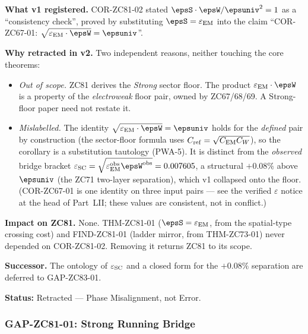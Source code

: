 \documentclass[12pt, a4paper]{article}
\renewcommand{\epsEM}{\varepsilon_{\rm EM}}
\begin{document}
\begin{openqbox}[title={PM-ZC81-RETRACT-01: COR-ZC81-02 Retracted
  --- Out of Scope and Mislabelled}]

\textbf{What v1 registered.}
COR-ZC81-02 stated $\epsS\cdot\epsW/\epsuniv^2 = 1$ as a
``consistency check'', proved by substituting $\epsS=\epsEM$ into
the claim ``COR-ZC67-01: $\sqrt{\epsEM\cdot\epsW}=\epsuniv$''.

\textbf{Why retracted in v2.}
Two independent reasons, neither touching the core theorems:
\begin{itemize}[leftmargin=2em, noitemsep]
  \item \textit{Out of scope.} ZC81 derives the \emph{Strong}
    sector floor. The product $\epsEM\cdot\epsW$ is a property of
    the \emph{electroweak} floor pair, owned by ZC67/68/69. A
    Strong-floor paper need not restate it.
  \item \textit{Mislabelled.} The identity
    $\sqrt{\epsEM\cdot\epsW}=\epsuniv$ holds for the \emph{defined}
    pair by construction (the sector-floor formula uses
    $C_{\rm ref}=\sqrt{C_{\rm EM}C_W}$), so the corollary is a
    substitution tautology (PWA-5). It is distinct from the
    \emph{observed} bridge
    bracket
    $\varepsilon_{\rm SC}=\sqrt{\epsEM^{\rm obs}\epsW^{\rm obs}}
    =0.007605$, a structural $+0.08\%$ above $\epsuniv$ (the ZC71
    two-layer separation), which v1 collapsed onto the floor.
    (COR-ZC67-01 is one identity on three input pairs --- see the
    verified $\varepsilon$ notice at the head of Part~LII; these values
    are consistent, not in conflict.)
\end{itemize}

\textbf{Impact on ZC81.}
None. THM-ZC81-01 ($\epsS=\epsEM$, from the spatial-type crossing
cost) and FIND-ZC81-01 (ladder mirror, from THM-ZC73-01) never
depended on COR-ZC81-02. Removing it returns ZC81 to its scope.

\textbf{Successor.} The ontology of $\varepsilon_{\rm SC}$ and a
closed form for the $+0.08\%$ separation are deferred to GAP-ZC83-01.

\textbf{Status:} Retracted --- Phase Misalignment, not Error.
\end{openqbox}

\subsubsection{GAP-ZC81-01: Strong Running Bridge}
\end{document}
